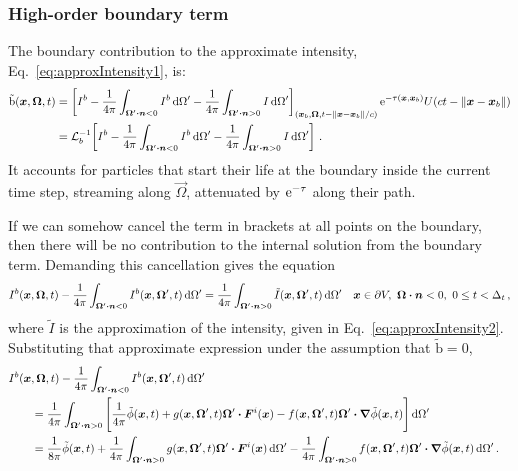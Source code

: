 \subsubsection{High-order boundary term}

The boundary contribution to the approximate intensity,
Eq.~\eqref{eq:approxIntensity1}, is:
\begin{align*}
  \mathrm{ \tilde b }(\bm{x}, \bm{\Omega}, t)
  &= \left[
  I^b
- \frac{1}{4\pi} \int_{\bm{\Omega}' \bm{\cdot} \bm{n} < 0} I^b \mathop{}\!\mathrm{d} \Omega'
- \frac{1}{4\pi} \int_{\bm{\Omega}' \bm{\cdot} \bm{n} > 0} I \mathop{}\!\mathrm{d} \Omega'
 \right]_{(\bm{x}_b, \bm{\Omega}, t - \left\| \bm{x} - \bm{x}_b \right\|/c)}
    \mathop{}\!\mathrm{e}^{ -\tau(\bm{x}, \bm{x}_b)} U(ct - \left\| \bm{x} - \bm{x}_b \right\|)
  \\
  &=
  \mathcal{L}_{b}^{-1}\!\left[ I^b
- \frac{1}{4\pi} \int_{\bm{\Omega}' \bm{\cdot} \bm{n} < 0} I^b \mathop{}\!\mathrm{d} \Omega'
- \frac{1}{4\pi} \int_{\bm{\Omega}' \bm{\cdot} \bm{n} > 0} I \mathop{}\!\mathrm{d} \Omega' \right]
 \,.
\end{align*}
It accounts for particles that start their life at the boundary inside the
current time step, streaming along $\vec{\Omega}$, attenuated by $\mathop{}\!\mathrm{e}^{
-\tau}$ along their path.

If we can somehow cancel the term in brackets at all points on the boundary,
then there will be no contribution to the internal solution from the boundary
term. Demanding this cancellation gives the equation
\begin{equation*}
I^b(\bm{x}, \bm{\Omega}, t)
- \frac{1}{4\pi} \int_{\bm{\Omega}' \bm{\cdot} \bm{n} < 0} I^b(\bm{x},
\bm{\Omega}', t) \mathop{}\!\mathrm{d} \Omega'
= \frac{1}{4\pi} \int_{\bm{\Omega}' \bm{\cdot} \bm{n} > 0} \tilde I(\bm{x},
\bm{\Omega}', t) \mathop{}\!\mathrm{d} \Omega'
 \quad \bm{x} \in \partial V, \ \bm{\Omega} \bm{\cdot} \bm{n} < 0,
 \ 0 \le t < \Delta_t\,,
\end{equation*}
where $\tilde I$ is the approximation of the intensity, given in
Eq.~\eqref{eq:approxIntensity2}.
Substituting that approximate expression under the assumption that
$\mathrm{ \tilde b }=0$,
\begin{align*}
\lefteqn{I^b(\vec{x}, \vec{\Omega}, t)
- \frac{1}{4\pi} \int_{\vec{\Omega}' \vd \vec{n} < 0} I^b(\vec{x},
\vec{\Omega}', t) \ud \Omega'}\qquad
\\
&= \frac{1}{4\pi} \int_{\vec{\Omega}' \vd \vec{n} > 0} 
\Bigg[
 \frac{1}{4\pi} \tilde \phi(\vec{x}, t)
 + g(\vec{x}, \vec{\Omega}', t) \vec{\Omega}' \vd \vec{F}^i(\vec{x})
 - f(\vec{x}, \vec{\Omega}', t) \vec{\Omega}'\vd \grad \tilde\phi(\vec{x},t)
 \Bigg] \ud \Omega'
 \\
&= \frac{1}{8\pi} \tilde \phi(\vec{x}, t)
+ \frac{1}{4\pi} \int_{\vec{\Omega}' \vd \vec{n} > 0} 
 g(\vec{x}, \vec{\Omega}', t) \vec{\Omega}' \vd \vec{F}^i(\vec{x})
 \ud \Omega'
- \frac{1}{4\pi} \int_{\vec{\Omega}' \vd \vec{n} > 0} 
 f(\vec{x}, \vec{\Omega}', t) \vec{\Omega}'\vd \grad \tilde\phi(\vec{x},t)
 \ud \Omega'\,.
\end{align*}

